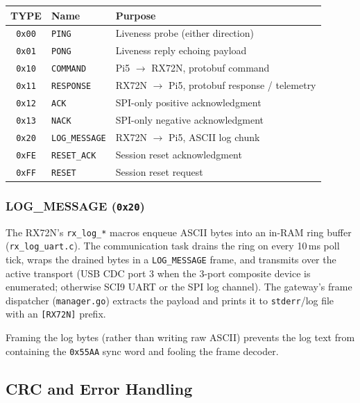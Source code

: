 \begin{center}
\begin{tabular}{|c|l|l|}
\hline
\textbf{TYPE} & \textbf{Name}        & \textbf{Purpose} \\
\hline
\texttt{0x00} & \texttt{PING}        & Liveness probe (either direction) \\
\texttt{0x01} & \texttt{PONG}        & Liveness reply echoing payload \\
\texttt{0x10} & \texttt{COMMAND}     & Pi5 $\rightarrow$ RX72N, protobuf command \\
\texttt{0x11} & \texttt{RESPONSE}    & RX72N $\rightarrow$ Pi5, protobuf response / telemetry \\
\texttt{0x12} & \texttt{ACK}         & SPI-only positive acknowledgment \\
\texttt{0x13} & \texttt{NACK}        & SPI-only negative acknowledgment \\
\texttt{0x20} & \texttt{LOG\_MESSAGE} & RX72N $\rightarrow$ Pi5, ASCII log chunk \\
\texttt{0xFE} & \texttt{RESET\_ACK}  & Session reset acknowledgment \\
\texttt{0xFF} & \texttt{RESET}       & Session reset request \\
\hline
\end{tabular}
\end{center}

\subsubsection{LOG\_MESSAGE (\texttt{0x20})}

The RX72N's \texttt{rx\_log\_*} macros enqueue ASCII bytes into an in-RAM ring
buffer (\texttt{rx\_log\_uart.c}). The communication task drains the ring on
every 10\,ms poll tick, wraps the drained bytes in a \texttt{LOG\_MESSAGE}
frame, and transmits over the active transport (USB CDC port 3 when the
3-port composite device is enumerated; otherwise SCI9 UART or the SPI
log channel). The gateway's frame dispatcher (\texttt{manager.go})
extracts the payload and prints it to \texttt{stderr}/log file with an
\texttt{[RX72N]} prefix.

Framing the log bytes (rather than writing raw ASCII) prevents the log text
from containing the \texttt{0x55AA} sync word and fooling the frame decoder.

\subsection{CRC and Error Handling}

